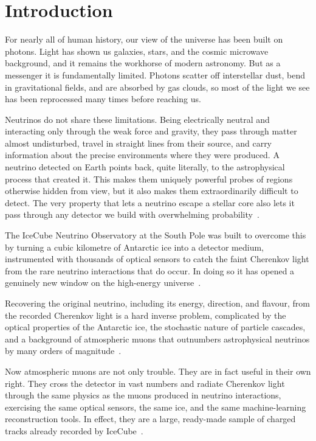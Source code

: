 ﻿%
\chapter{Introduction}

For nearly all of human history, our view of the universe has been built on photons. Light has shown us galaxies, stars, and the cosmic microwave background, and it remains the workhorse of modern astronomy. But as a messenger it is fundamentally limited.
Photons scatter off interstellar dust, bend in gravitational fields, and are absorbed by gas clouds, so most of the light we see has been reprocessed many times before reaching us.

Neutrinos do not share these limitations. Being electrically neutral and interacting only through the weak force and gravity, they pass through matter almost undisturbed, travel in straight lines from their source, and carry information about the precise environments where they were produced. A neutrino detected on Earth points back, quite literally, to the astrophysical process that created it. This makes them uniquely powerful probes of regions otherwise hidden from view, but it also makes them extraordinarily difficult to detect. The very property that lets a neutrino escape a stellar core also lets it pass through any detector we build with overwhelming probability~\cite{MartinShaw2019}.

The IceCube Neutrino Observatory at the South Pole was built to overcome this by turning a cubic kilometre of Antarctic ice into a detector medium, instrumented with thousands of optical sensors to catch the faint Cherenkov light from the rare neutrino interactions that do occur. In doing so it has opened a genuinely new window on the high-energy universe~\cite{IceCube2017}.

Recovering the original neutrino, including its energy, direction, and flavour, from the recorded Cherenkov light is a hard inverse problem, complicated by the optical properties of the Antarctic ice, the stochastic nature of particle cascades, and a background of atmospheric muons that outnumbers astrophysical neutrinos by many orders of magnitude~\cite{IceCube2017}.

Now atmospheric muons are not only trouble. They are in fact useful in their own right. They cross the detector in vast numbers and radiate Cherenkov light through the same physics as the muons produced in neutrino interactions, exercising the same optical sensors, the same ice, and the same machine-learning reconstruction tools. In effect, they are a large, ready-made sample of charged tracks already recorded by IceCube~\cite{IceCube2017}.

